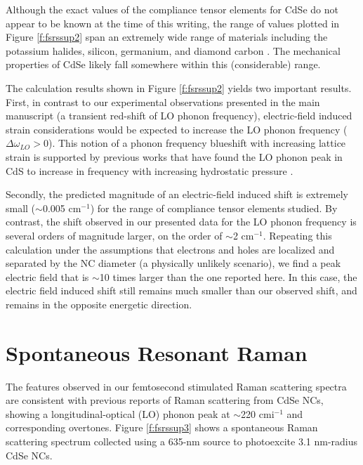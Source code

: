Although the exact values of the compliance tensor elements for CdSe do not appear to be known at the time of this writing, the range of values plotted in Figure \ref{f:fsrssup2} span an extremely wide range of materials including the potassium halides, silicon, germanium, and diamond carbon \cite{martienssen2006springer}. The mechanical properties of CdSe likely fall somewhere within this (considerable) range. \par

The calculation results shown in Figure \ref{f:fsrssup2} yields two important results. First, in contrast to our experimental observations presented in the main manuscript (a transient red-shift of LO phonon frequency), electric-field induced strain considerations would be expected to increase the LO phonon frequency ($\Delta\omega_{LO} > 0$). This notion of a phonon frequency blueshift with increasing lattice strain is supported by previous works that have found the LO phonon peak in CdS to increase in frequency with increasing hydrostatic pressure \cite{lewis2001handbook}. \par

Secondly, the predicted magnitude of an electric-field induced shift is extremely small ($\sim$0.005 cm$^{-1}$) for the range of compliance tensor elements studied. By contrast, the shift observed in our presented data for the LO phonon frequency is several orders of magnitude larger, on the order of $\sim$2 cm$^{-1}$. Repeating this calculation under the assumptions that electrons and holes are localized and separated by the NC diameter (a physically unlikely scenario), we find a peak electric field that is $\sim$10 times larger than the one reported here. In this case, the electric field induced shift still remains much smaller than our observed shift, and remains in the opposite energetic direction.

\section{Spontaneous Resonant Raman}
The features observed in our femtosecond stimulated Raman scattering spectra are consistent with previous reports of Raman scattering from CdSe NCs, showing a longitudinal-optical (LO) phonon peak at $\sim$220 cmi$^{-1}$ and corresponding overtones. Figure \ref{f:fsrssup3} shows a spontaneous Raman scattering spectrum collected using a 635-nm source to photoexcite 3.1 nm-radius CdSe NCs.

